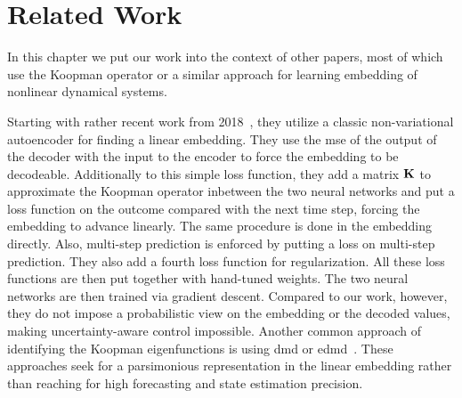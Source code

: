 \chapter{Related Work}
\label{c:relatedWork}



In this chapter we put our work into the context of other papers, most of which use the Koopman operator or a similar approach for learning embedding of nonlinear dynamical systems.

Starting with rather recent work from 2018~\cite{luschDeepLearningUniversal2018}, they utilize a classic non-variational autoencoder for finding a linear embedding. They use the \ac{mse} of the output of the decoder with the input to the encoder to force the embedding to be decodeable. Additionally to this simple loss function, they add a matrix \(\boldsymbol{\mathrm{K}}\) to approximate the Koopman operator inbetween the two neural networks and put a loss function on the outcome compared with the next time step, forcing the embedding to advance linearly. The same procedure is done in the embedding directly. Also, multi-step prediction is enforced by putting a loss on multi-step prediction. They also add a fourth loss function for regularization. All these loss functions are then put together with hand-tuned weights. The two neural networks are then trained via gradient descent. Compared to our work, however, they do not impose a probabilistic view on the embedding or the decoded values, making uncertainty-aware control impossible. Another common approach of identifying the Koopman eigenfunctions is using \ac{dmd} or \ac{edmd}~\cite{bruntonKoopmanInvariantSubspaces2016,kaiserDatadrivenDiscoveryKoopman2020,williamsDataDrivenApproximation2015}. These approaches seek for a parsimonious representation in the linear embedding rather than reaching for high forecasting and state estimation precision.

